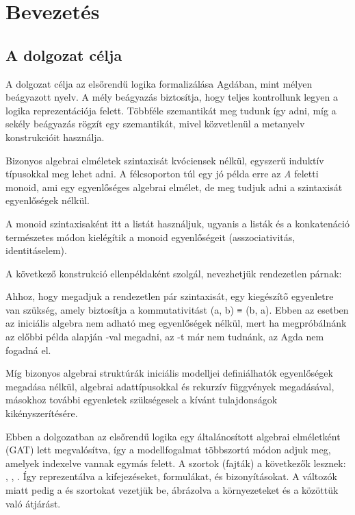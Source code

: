 \chapter{Bevezetés}
\label{ch:intro}



\section{A dolgozat célja}

A dolgozat célja az elsőrendű logika formalizálása Agdában, mint mélyen beágyazott nyelv. A mély beágyazás biztosítja, hogy teljes kontrollunk legyen a logika reprezentációja felett. Többféle szemantikát meg tudunk így adni, míg a sekély beágyazás rögzít egy szemantikát, mivel közvetlenül a metanyelv konstrukcióit használja.



Bizonyos algebrai elméletek szintaxisát kvóciensek nélkül, egyszerű induktív típusokkal meg lehet adni. A félcsoporton túl egy jó példa erre az \textit{A} feletti monoid, ami egy egyenlőséges algebrai elmélet, de meg tudjuk adni a szintaxisát egyenlőségek nélkül.



A monoid szintaxisaként itt a listát használjuk, ugyanis a listák és a konkatenáció természetes módon kielégítik a monoid egyenlőségeit (asszociativitás, identitáselem).

A következő konstrukció ellenpéldaként szolgál, nevezhetjük rendezetlen párnak:



Ahhoz, hogy megadjuk a rendezetlen pár szintaxisát, egy kiegészítő egyenletre van szükség, amely biztosítja a kommutativitást (a, b) ≡ (b, a). Ebben az esetben az iniciális algebra nem adható meg egyenlőségek nélkül, mert ha megpróbálnánk az előbbi példa alapján -val megadni, az -t már nem tudnánk, az Agda nem fogadná el.

Míg bizonyos algebrai struktúrák iniciális modelljei definiálhatók egyenlőségek megadása nélkül, algebrai adattípusokkal és rekurzív függvények megadásával, másokhoz további egyenletek szükségesek a kívánt tulajdonságok kikényszerítésére.

Ebben a dolgozatban az elsőrendű logika egy általánosított algebrai elméletként (GAT) lett megvalósítva, így a modellfogalmat többszortú módon adjuk meg, amelyek indexelve vannak egymás felett. A szortok (fajták) a következők lesznek: , , . Így reprezentálva a kifejezéseket, formulákat, és bizonyításokat. A változók miatt pedig a  és  szortokat vezetjük be, ábrázolva a környezeteket és a közöttük való átjárást.

